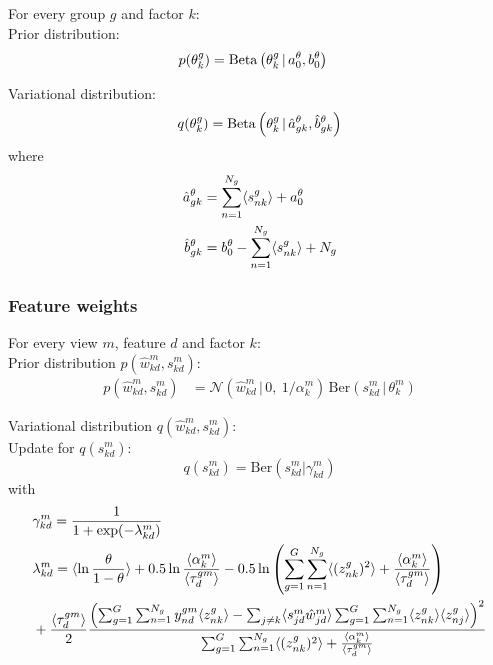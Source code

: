 For every group $g$ and factor $k$: \\

Prior distribution:
\begin{align}
	p(\theta_k^g) &= \text{Beta}\left(\theta_k^g \,|\, a_0^\theta,b_0^\theta\right)
\end{align}

Variational distribution:
\begin{equation}
	q(\theta_k^g) = \text{Beta}\left(\theta_k^g \,|\, \hat{a}_{gk}^{\theta}, \hat{b}_{gk}^{\theta}\right)
\end{equation}
where
\begin{equation}
     \begin{aligned}
  	\hat{a}_{gk}^\theta &= \sum_{n=1}^{N_g} \langle s^g_{nk}\rangle + a_0^\theta\\
  	\hat{b}_{gk}^\theta &= b_0^\theta - \sum_{n=1}^{N_g} \langle s^g_{nk}\rangle + N_g
     \end{aligned}
\end{equation}

\subsubsection*{Feature weights}
For every view $m$, feature $d$ and factor $k$: \\

Prior distribution $p(\hat{w}_{kd}^m,s_{kd}^m)$:
\begin{align}
	p(\hat{w}_{kd}^m,s_{kd}^m) &= \mathcal{N} (\hat{w}_{kd}^m \,|\, 0, ~ 1/\alpha_k^m)\, \text{Ber}(s_{kd}^m \,|\,\theta_k^m)
\end{align}

Variational distribution $q(\hat{w}_{kd}^m,s_{kd}^m)$:\\

Update for $q(s_{kd}^m)$:
\begin{equation}
	q(s^m_{kd}) = \mathrm{Ber}(s^m_{kd}|\gamma^m_{kd})
\end{equation}
with
\begin{equation} \begin{aligned}
	&\gamma^m_{kd} = \frac{1}{1+\exp(-\lambda_{kd}^m)}\\
	& \lambda_{kd}^m = \langle \ln\frac{\theta}{1-\theta} \rangle + 0.5\ln\frac{\langle\alpha_k^m\rangle}{\langle\tau_d^{gm}\rangle} - 0.5\ln\left( \sum_{g=1}^G\sum_{n=1}^{N_g} \langle (z_{nk}^g)^2 \rangle + \frac{\langle\alpha_k^m\rangle}{\langle\tau_d^{gm}\rangle} \right) \\
	&+ \frac{\langle\tau_d^{gm}\rangle}{2} \frac{ \left( \sum_{g=1}^G\sum_{n=1}^{N_g} y_{nd}^{gm} \langle z^g_{nk} \rangle - \sum_{j \neq k} \langle s_{jd}^m\hat{w}_{jd}^m\rangle \sum_{g=1}^G\sum_{n=1}^{N_g} \langle z^g_{nk} \rangle \langle z^g_{nj} \rangle \right)^2} {\sum_{g=1}^G\sum_{n=1}^{N_g} \langle (z_{nk}^g)^2 \rangle + \frac{\langle\alpha_k^m\rangle}{\langle\tau_d^{gm}\rangle} }
\end{aligned} \end{equation}

